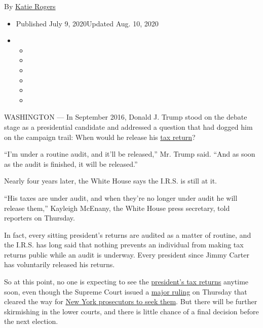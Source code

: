 By \href{https://www.nytimes3xbfgragh.onion/by/katie-rogers}{Katie
Rogers}

\begin{itemize}
\item
  Published July 9, 2020Updated Aug. 10, 2020
\item
  \begin{itemize}
  \item
  \item
  \item
  \item
  \item
  \item
  \end{itemize}
\end{itemize}

WASHINGTON --- In September 2016, Donald J. Trump stood on the debate
stage as a presidential candidate and addressed a question that had
dogged him on the campaign trail: When would he release his
\href{https://www.nytimes3xbfgragh.onion/2020/07/15/nyregion/donald-trump-taxes-cyrus-vance.html}{tax
return}?

``I'm under a routine audit, and it'll be released,'' Mr. Trump said.
``And as soon as the audit is finished, it will be released.''

Nearly four years later, the White House says the I.R.S. is still at it.

``His taxes are under audit, and when they're no longer under audit he
will release them,'' Kayleigh McEnany, the White House press secretary,
told reporters on Thursday.

In fact, every sitting president's returns are audited as a matter of
routine, and the I.R.S. has long said that nothing prevents an
individual from making tax returns public while an audit is underway.
Every president since Jimmy Carter has voluntarily released his returns.

So at this point, no one is expecting to see the
\href{https://www.nytimes3xbfgragh.onion/2020/08/20/nyregion/donald-trump-taxes-cyrus-vance.html}{president's
tax returns} anytime soon, even though the Supreme Court issued a
\href{https://www.nytimes3xbfgragh.onion/2020/07/09/us/trump-taxes-supreme-court.html}{major
ruling} on Thursday that cleared the way for
\href{https://www.nytimes3xbfgragh.onion/2020/08/10/nyregion/donald-trump-taxes-cyrus-vance.html}{New
York prosecutors to seek them}. But there will be further skirmishing in
the lower courts, and there is little chance of a final decision before
the next election.

